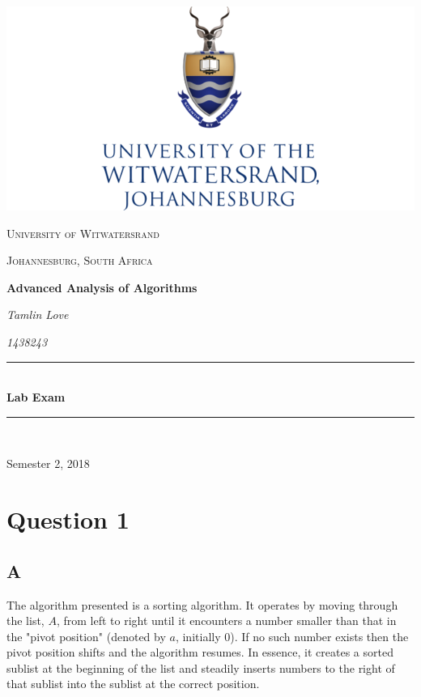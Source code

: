 \documentclass[a4paper]{article}
\author{Tamlin Love}
\date{\today}
\begin{document}
\begin{titlepage}
	\centering
	
\includegraphics[scale=0.6]{index.png}
	\vspace{0.5cm}
	
\newcommand{\HRule}{\rule{\linewidth}{0.5mm}} 

{\scshape\Large University of Witwatersrand\par}
{\scshape\Large Johannesburg, South Africa\par}
	\vspace{1cm}
	{\huge\bfseries Advanced Analysis of Algorithms\par}
	\vspace{1cm}
	{\Large\itshape Tamlin Love\par}
	\vspace{0.5cm}
	{\Large\itshape 1438243\par}
	\vfill
	
\HRule \\[0.4cm]
{ \huge \bfseries Lab Exam}\\[0.4cm] 
\HRule \\[1.5cm]

	{\large Semester 2, 2018\par}

\end{titlepage}
\section{Question 1}
\subsection{A}
The algorithm presented is a sorting algorithm. It operates by moving through the list, $A$, from left to right until it encounters a number smaller than that in the "pivot position" (denoted by $a$, initially 0). If no such number exists then the pivot position shifts and the algorithm resumes.
\newline
In essence, it creates a sorted sublist at the beginning of the list and steadily inserts numbers to the right of that sublist into the sublist at the correct position.
\end{document}
